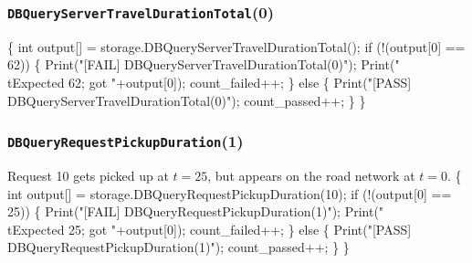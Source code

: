 \documentclass{article}
\def\nwendcode{\endtrivlist \endgroup}
\let\nwdocspar=\par
\theoremstyle{definition}
\begin{document}
\subsubsection{{\tt{}DBQueryServerTravelDurationTotal}(0)}
\nwenddocs{}\endmoddef{}
\{
  int output[] = storage.DBQueryServerTravelDurationTotal();
  if (!(output[0] == 62)) \{
    Print("[FAIL] DBQueryServerTravelDurationTotal(0)");
    Print("\\tExpected 62; got "+output[0]);
    count_failed++;
  \} else \{
    Print("[PASS] DBQueryServerTravelDurationTotal(0)");
    count_passed++;
  \}
\}
\nwendcode{}\nwdocspar
\subsubsection{{\tt{}DBQueryRequestPickupDuration}(1)}
Request 10 gets picked up at $t=25$, but appears on the road network at $t=0$.
\nwenddocs{}\endmoddef{}
\{
  int output[] = storage.DBQueryRequestPickupDuration(10);
  if (!(output[0] == 25)) \{
    Print("[FAIL] DBQueryRequestPickupDuration(1)");
    Print("\\tExpected 25; got "+output[0]);
    count_failed++;
  \} else \{
    Print("[PASS] DBQueryRequestPickupDuration(1)");
    count_passed++;
  \}
\}
\nwendcode{}\nwdocspar
\end{document}
